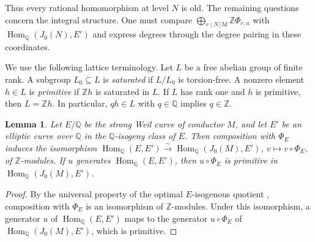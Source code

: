 \documentclass[12pt, letterpaper]{amsart}
\newtheorem{lemma}[theorem]{Lemma}
\theoremstyle{definition}
\theoremstyle{remark}
\newcommand{\Q}{\mathbb Q}
\newcommand{\Z}{\mathbb Z}
\newcommand{\Hom}{\operatorname{Hom}}
\numberwithin{equation}{section}
\begin{document}
Thus every rational homomorphism at level \(N\) is old. The remaining questions
concern the integral structure. One must compare
\(\bigoplus_{r\mid N/M}\Z\Phi_{r,u}\) with
\(\Hom_\Q(J_0(N),E')\) and express degrees through the degree pairing in these
coordinates.

We use the following lattice terminology. Let \(L\) be a free abelian group of finite
rank. A subgroup \(L_0\subseteq L\) is \emph{saturated} if \(L/L_0\) is
torsion-free. A nonzero element \(h\in L\) is \emph{primitive} if \(\Z h\) is
saturated in \(L\). If \(L\) has rank one and \(h\) is primitive, then
\(L=\Z h\). In particular, \(qh\in L\) with \(q\in\Q\) implies \(q\in\Z\).

\begin{lemma}\label{lem:optimal-primitivity}
Let \(E/\Q\) be the strong Weil curve of conductor \(M\), and let \(E'\) be an
elliptic curve over \(\Q\) in the \(\Q\)-isogeny class of \(E\). Then composition
with \(\Phi_E\) induces the isomorphism
\(\Hom_\Q(E,E')\xrightarrow{\sim}\Hom_\Q(J_0(M),E')\),
\(v\mapsto v\circ\Phi_E\), of \(\Z\)-modules.
If \(u\) generates \(\Hom_\Q(E,E')\), then \(u\circ\Phi_E\) is primitive in
\(\Hom_\Q(J_0(M),E')\).
\end{lemma}

\begin{proof}
By the universal property of the optimal \(E\)-isogenous quotient
\cite{DerickxOrlic}, composition with \(\Phi_E\)
is an isomorphism of \(\Z\)-modules. Under this isomorphism, a generator \(u\)
of \(\Hom_\Q(E,E')\) maps to the generator \(u\circ\Phi_E\) of
\(\Hom_\Q(J_0(M),E')\), which is primitive.
\end{proof}
\end{document}
